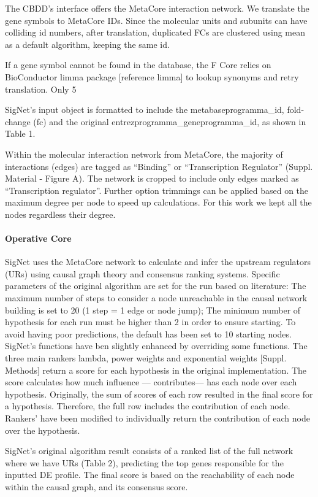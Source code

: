 The CBDD's interface offers the MetaCore interaction network. We translate the gene symbols to MetaCore IDs. Since the molecular units and subunits can have colliding id numbers, after translation, duplicated FCs are clustered using mean as a default algorithm, keeping the same id.


If a gene symbol cannot be found in the database, the F Core relies on BioConductor limma package [reference limma] to lookup synonyms and retry translation. Only 5%


SigNet’s input object is formatted to include the metabaseprogramma\_id, fold-change (fc) and the original entrezprogramma\_geneprogramma\_id, as shown in Table 1.


Within the molecular interaction network from MetaCore, the majority of interactions (edges) are tagged as “Binding” or “Transcription Regulator” (Suppl. Material - Figure A). The network is cropped to include only edges marked as “Transcription regulator”. Further option trimmings can be applied based on the maximum degree per node to speed up calculations. For this work we kept all the nodes regardless their degree.

\paragraph{Operative Core}
SigNet uses the MetaCore network to calculate and infer the upstream regulators (URs) using causal graph theory and consensus ranking systems. Specific parameters of the original algorithm are set for the run based on literature: The maximum number of steps to consider a node unreachable in the causal network building is set to 20 (1 step = 1 edge or node jump); The minimum number of hypothesis for each run must be higher than 2 in order to ensure starting. To avoid having poor predictions, the default has been set to 10 starting nodes.
SigNet’s functions have ben slightly enhanced by overriding some functions. The three main rankers lambda, power weights and exponential weights [Suppl. Methods] return a score for each hypothesis in the original implementation. The score calculates how much influence — contributes— has each node over each hypothesis. Originally, the sum of scores of each row resulted in the final score for a hypothesis. Therefore, the full row includes the contribution of each node. Rankers’ have been modified to individually return the contribution of each node over the hypothesis.

SigNet’s original algorithm result consists of a ranked list of the full network where we have URs (Table 2), predicting the top genes responsible for the inputted DE profile. The final score is based on the reachability of each node within the causal graph, and its consensus score.

